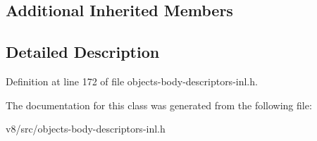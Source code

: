 \subsection*{Additional Inherited Members}


\subsection{Detailed Description}


Definition at line 172 of file objects-\/body-\/descriptors-\/inl.\+h.



The documentation for this class was generated from the following file\+:\begin{DoxyCompactItemize}
\item 
v8/src/objects-\/body-\/descriptors-\/inl.\+h\end{DoxyCompactItemize}
